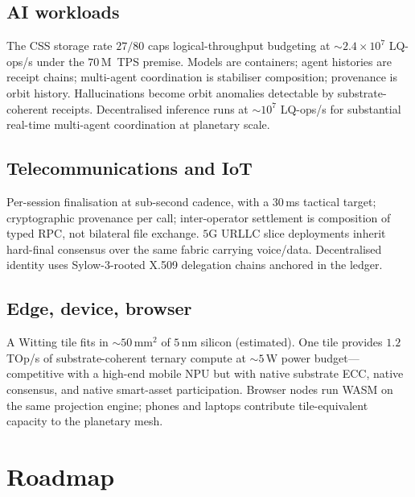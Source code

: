 \documentclass[11pt,letterpaper]{article}
\theoremstyle{remark}
\begin{document}
\subsection{AI workloads}
The CSS storage rate $27/80$ caps logical-throughput budgeting at
$\sim 2.4 \times 10^7$ LQ-ops/s under the $70$\,M~TPS premise.
Models are containers; agent histories are receipt chains; multi-agent coordination is
stabiliser composition; provenance is orbit history. Hallucinations become orbit
anomalies detectable by substrate-coherent receipts. Decentralised inference runs at
$\sim 10^7$ LQ-ops/s for substantial real-time multi-agent coordination at planetary
scale.

\subsection{Telecommunications and IoT}
Per-session finalisation at sub-second cadence, with a $30$\,ms tactical target;
cryptographic provenance per call;
inter-operator settlement is composition of typed RPC, not bilateral file exchange. $5$G
URLLC slice deployments inherit hard-final consensus over the same fabric carrying
voice/data. Decentralised identity uses Sylow-$3$-rooted X.509 delegation chains anchored
in the ledger.

\subsection{Edge, device, browser}
A Witting tile fits in $\sim 50$\,mm$^2$ of $5$\,nm silicon (estimated). One tile provides
$1.2$\,TOp/s of substrate-coherent ternary compute at $\sim 5$\,W power budget---competitive
with a high-end mobile NPU but with native substrate ECC, native consensus, and native
smart-asset participation. Browser nodes run WASM on the same projection engine; phones
and laptops contribute tile-equivalent capacity to the planetary mesh.

\section{Roadmap}
\end{document}
